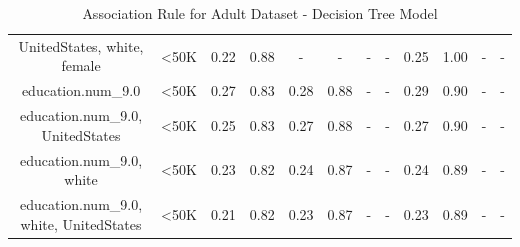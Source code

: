 \begin{table}[H]
{\begin{tabular}{|c|c|c|c|c|c|c|c|c|c|c|c|}
UnitedStates, white, female & <50K & 0.22 & 0.88 & - & - & - & - & 0.25 & 1.00 & - & - \\
education.num\_9.0 & <50K & 0.27 & 0.83 & 0.28 & 0.88 & - & - & 0.29 & 0.90 & - & - \\
education.num\_9.0, UnitedStates & <50K & 0.25 & 0.83 & 0.27 & 0.88 & - & - & 0.27 & 0.90 & - & - \\
education.num\_9.0, white & <50K & 0.23 & 0.82 & 0.24 & 0.87 & - & - & 0.24 & 0.89 & - & - \\
education.num\_9.0, white, UnitedStates & <50K & 0.21 & 0.82 & 0.23 & 0.87 & - & - & 0.23 & 0.89 & - & - \\
        \hline
        \end{tabular}
        }
        \\[10pt]
        \caption{Association Rule for Adult Dataset - Decision Tree Model}
        \label{table:asso_rules_adult_Decision Tree}
        \end{table}
        
